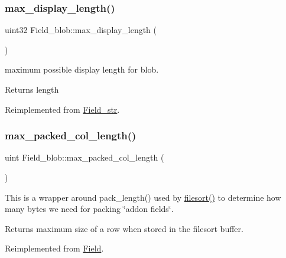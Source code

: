 \subsubsection{\texorpdfstring{max\+\_\+display\+\_\+length()}{max\_display\_length()}}
{\footnotesize\ttfamily uint32 Field\+\_\+blob\+::max\+\_\+display\+\_\+length (\begin{DoxyParamCaption}{ }\end{DoxyParamCaption})\hspace{0.3cm}{\ttfamily [virtual]}}

maximum possible display length for blob.

\begin{DoxyReturn}{Returns}
length 
\end{DoxyReturn}


Reimplemented from \mbox{\hyperlink{classField__str}{Field\+\_\+str}}.

\mbox{\label{classField__blob_ad9fa84e8473ea63cbdd413c99dd9dbb4}} 
\subsubsection{\texorpdfstring{max\+\_\+packed\+\_\+col\+\_\+length()}{max\_packed\_col\_length()}}
{\footnotesize\ttfamily uint Field\+\_\+blob\+::max\+\_\+packed\+\_\+col\+\_\+length (\begin{DoxyParamCaption}{ }\end{DoxyParamCaption})\hspace{0.3cm}{\ttfamily [virtual]}}

This is a wrapper around pack\+\_\+length() used by \mbox{\hyperlink{filesort_8cc_a953fde8362f86f7fb832e9a1e2c06530}{filesort()}} to determine how many bytes we need for packing \char`\"{}addon fields\char`\"{}. \begin{DoxyReturn}{Returns}
maximum size of a row when stored in the filesort buffer. 
\end{DoxyReturn}


Reimplemented from \mbox{\hyperlink{classField_a05d15db9879fe9ae68415819b3dbf96f}{Field}}.

\mbox{\label{classField__blob_ae15681deef846bd350bdb09b5132b120}} 
